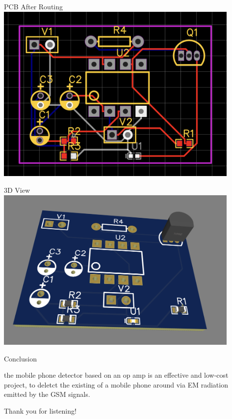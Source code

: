 \documentclass{loyola-beamer}
\begin{document}
\begin{frame}{PCB After Routing}
	\includegraphics[width=0.9\textwidth]{../PCB-after.png}
\end{frame}


\begin{frame}{3D View}
	\includegraphics[width=0.9\textwidth]{../3D-PCB.png}
\end{frame}


\begin{frame}{Conclusion}

	the mobile phone detector based on an op amp is an effective and low-cost project,
	to deletct the existing of a mobile phone around via EM radiation emitted by the GSM signals.

\end{frame}





\begin{titleframe}{Thank you for listening!}

\end{titleframe}
\end{document}
